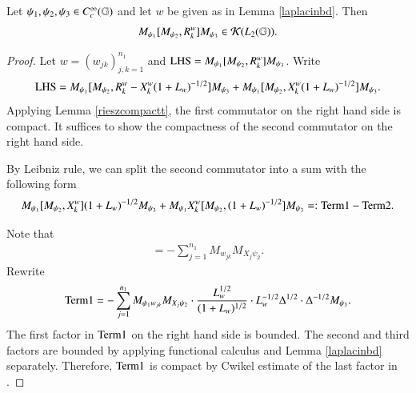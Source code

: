 \documentclass[leqno]{amsart}
\begin{document}
	
	
	
	
	
	\begin{proposition}\label{compactrieszcommu}
		Let $\psi_{1},\psi_{2},\psi_{3}\in C_{c}^{\infty}(\mathbb{G})$ and let $w$ be given as in Lemma \ref{laplacinbd}. Then
		\begin{align*}
			M_{\psi_{1}}[M_{\psi_{2}},{ R}^{w}_{k}]M_{\psi_{3}}\in{\mathcal K}(L_{2}(\mathbb{G})).
		\end{align*}
	\end{proposition}
	\begin{proof}
		Let $w=(w_{jk})_{j,k=1}^{n_{1}}$ and ${\rm LHS}=M_{\psi_{1}}[M_{\psi_{2}},{ R}^{w}_{k}]M_{\psi_{3}}$.
		Write
		\begin{align*}
			{\rm LHS}
			=M_{\psi_{1}}[M_{\psi_{2}},{ R}^{w}_{k}-X_{k}^{w}(1+L_{w})^{-1/2}]M_{\psi_{3}}
			+M_{\psi_{1}}[M_{\psi_{2}},X_{k}^{w}(1+L_{w})^{-1/2}]M_{\psi_{3}}.
		\end{align*}
		Applying Lemma \ref{rieszcompactt}, the first commutator on the right hand side is compact. It suffices to show the compactness of the second commutator on the right hand side.
		
		By Leibniz rule, we can split the second commutator into a sum with the following form
		\begin{align*}
			M_{\psi_{1}}[M_{\psi_{2}},X_{k}^{w}](1+L_{w})^{-1/2}M_{\psi_{3}}
			+M_{\psi_{1}}X_{k}^{w}[M_{\psi_{2}},(1+L_{w})^{-1/2}]M_{\psi_{3}}=:{\rm Term1}-{\rm Term2}.
		\end{align*}
		
		Note that
		\begin{align*}
			[M_{\psi_{2}},X_{k}^{w}]=-\sum_{j=1}^{n_{1}}M_{w_{jk}}M_{X_{j}\psi_{2}}.
		\end{align*}
		Rewrite
		\begin{align*}
			{\rm Term1}
			=-\sum_{j=1}^{n_{1}}M_{\psi_{1}w_{jk}}M_{X_{j}\psi_{2}}\cdot\frac{L_{w}^{1/2}}{(1+L_{w})^{1/2}}
			\cdot L_{w}^{-1/2}\Delta^{1/2}\cdot\Delta^{-1/2}M_{\psi_{3}}.
		\end{align*}
		The first factor in ${\rm Term1}$ on the right hand side is bounded. 
		The second and third factors are bounded by applying functional calculus and Lemma \ref{laplacinbd} separately. Therefore, ${\rm Term1}$ is compact by Cwikel estimate of the last factor in \cite{MSZ-Cwikel}.
		

\end{proof}
\end{document}

